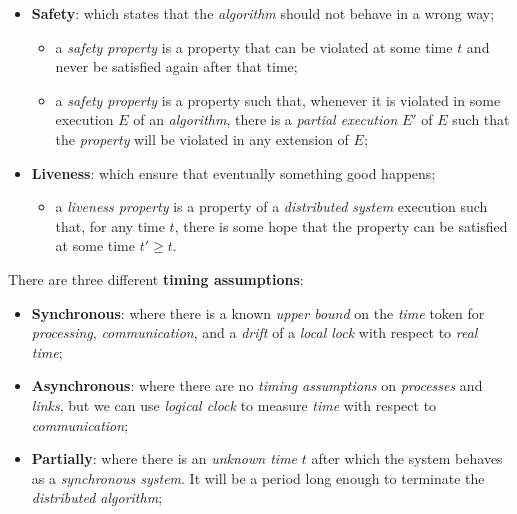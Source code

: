 \documentclass{article}
\begin{document}
\begin{itemize}
\item \textbf{Safety}: which states that the \emph{algorithm} should not behave in a wrong way;
\begin{itemize}
\item a \emph{safety property} is a property that can be violated at some time $t$ and never be satisfied again after that time;
\item a \emph{safety property} is a property such that, whenever it is violated in some execution $E$ of an \emph{algorithm}, there is a \emph{partial execution} ${E}'$ of $E$ such that the \emph{property} will be violated in any extension of $E$;
\end{itemize}
\item \textbf{Liveness}: which ensure that eventually something good happens;
\begin{itemize}
\item a \emph{liveness property} is a property of a \emph{distributed system} execution such that, for any time $t$, there is some hope that the property can be satisfied at some time ${t}' \geq t$.
\end{itemize}
\end{itemize}
There are three different \textbf{timing assumptions}:
\begin{itemize}
\item \textbf{Synchronous}: where there is a known \emph{upper bound} on the \emph{time} token for \emph{processing}, \emph{communication}, and a \emph{drift} of a \emph{local lock} with respect to \emph{real time};
\item \textbf{Asynchronous}: where there are no \emph{timing assumptions} on \emph{processes} and \emph{links}, but we can use \emph{logical clock} to measure \emph{time} with respect to \emph{communication}; 
\item  \textbf{Partially}: where there is an \emph{unknown time} $t$ after which the system behaves as a \emph{synchronous system}. It will be a period long enough to terminate the \emph{distributed algorithm};
\end{itemize}
\clearpage
\end{document}
